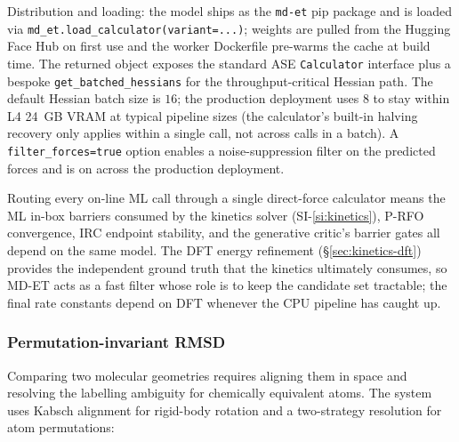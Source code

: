 Distribution and loading: the model ships as the \texttt{md-et} pip package and is loaded via \texttt{md\_et.load\_calculator(variant=...)}; weights are pulled from the Hugging Face Hub on first use and the worker Dockerfile pre-warms the cache at build time. The returned object exposes the standard ASE \texttt{Calculator} interface plus a bespoke \texttt{get\_batched\_hessians} for the throughput-critical Hessian path. The default Hessian batch size is $16$; the production deployment uses $8$ to stay within L4 24~GB VRAM at typical pipeline sizes (the calculator's built-in halving recovery only applies within a single call, not across calls in a batch). A \texttt{filter\_forces=true} option enables a noise-suppression filter on the predicted forces and is on across the production deployment.

Routing every on-line ML call through a single direct-force calculator means the ML in-box barriers consumed by the kinetics solver (SI-\ref{si:kinetics}), P-RFO convergence, IRC endpoint stability, and the generative critic's barrier gates all depend on the same model. The DFT energy refinement (\S\ref{sec:kinetics-dft}) provides the independent ground truth that the kinetics ultimately consumes, so MD-ET acts as a fast filter whose role is to keep the candidate set tractable; the final rate constants depend on DFT whenever the CPU pipeline has caught up.


\subsubsection{Permutation-invariant RMSD}
\label{sec:shared-rmsd}

Comparing two molecular geometries requires aligning them in space and resolving the labelling ambiguity for chemically equivalent atoms. The system uses Kabsch alignment for rigid-body rotation and a two-strategy resolution for atom permutations:

